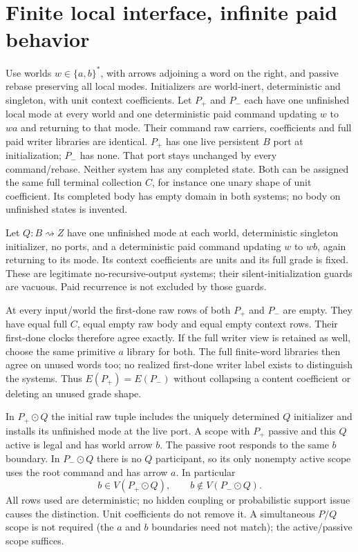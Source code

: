 \documentclass[11pt]{article}\usepackage{amsmath,amssymb,amsthm,geometry}\geometry{margin=1in}
\begin{document}
\section{Finite local interface, infinite paid behavior}
Use worlds $w\in\{a,b\}^*$, with arrows adjoining a word on the right, and passive rebase preserving all local modes. Initializers are world-inert, deterministic and singleton, with unit context coefficients. Let $P_+$ and $P_-$ each have one unfinished local mode at every world and one deterministic paid command updating $w$ to $wa$ and returning to that mode. Their command raw carriers, coefficients and full paid writer libraries are identical. $P_+$ has one live persistent $B$ port at initialization; $P_-$ has none. That port stays unchanged by every command/rebase. Neither system has any completed state. Both can be assigned the same full terminal collection $C$, for instance one unary shape of unit coefficient. Its completed body has empty domain in both systems; no body on unfinished states is invented.

Let $Q:B\rightsquigarrow Z$ have one unfinished mode at each world, deterministic singleton initializer, no ports, and a deterministic paid command updating $w$ to $wb$, again returning to its mode. Its context coefficients are units and its full grade is fixed. These are legitimate no-recursive-output systems; their silent-initialization guards are vacuous. Paid recurrence is not excluded by those guards.

At every input/world the first-done raw rows of both $P_+$ and $P_-$ are empty. They have equal full $C$, equal empty raw body and equal empty context rows. Their first-done clocks therefore agree exactly. If the full writer view is retained as well, choose the same primitive $a$ library for both. The full finite-word libraries then agree on unused words too; no realized first-done writer label exists to distinguish the systems. Thus $E(P_+)=E(P_-)$ without collapsing a content coefficient or deleting an unused grade shape.

In $P_+\odot Q$ the initial raw tuple includes the uniquely determined $Q$ initializer and installs its unfinished mode at the live port. A scope with $P_+$ passive and this $Q$ active is legal and has world arrow $b$. The passive root responds to the same $b$ boundary. In $P_-\odot Q$ there is no $Q$ participant, so its only nonempty active scope uses the root command and has arrow $a$. In particular
\[
 b\in V(P_+\odot Q),\qquad b\notin V(P_-\odot Q).       \tag{2}
\]
All rows used are deterministic; no hidden coupling or probabilistic support issue causes the distinction. Unit coefficients do not remove it. A simultaneous $P/Q$ scope is not required (the $a$ and $b$ boundaries need not match); the active/passive scope suffices.
\end{document}
